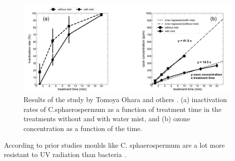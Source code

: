 \begin{figure}
    \centering
    \includegraphics[width=1\textwidth]{images/KIT_work.png}
    \caption[Results of the study by Tomoya Ohara and others]{Results of the study by Tomoya Ohara and others \cite{kit}. (a) inactivation rates of C.sphaerospermum as a function of treatment time in the
    treatments without and with water mist, and (b) ozone concentration as a function of the
    time.}
    \label{fig:kit}
\end{figure}

According to prior studies moulds like C. sphaerospermum are a lot more resistant to UV radiation than bacteria \cite{app_study}. 